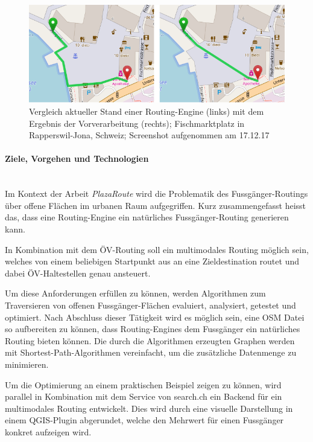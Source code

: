 \begin{figure}[ht]
    \centering
    \includegraphics[width=1\linewidth]{technicalreport/img/compare_fischmarktplatz.png}
    \caption[Vergleich Ausgangslage und Ergebnis]{Vergleich aktueller Stand einer Routing-Engine (links) mit dem Ergebnis der Vorverarbeitung (rechts); Fischmarktplatz in Rapperswil-Jona, Schweiz; Screenshot aufgenommen am 17.12.17}
    \label{fig:compare_fischmarktplatz}
\end{figure}


\paragraph{Ziele, Vorgehen und Technologien}~\\
Im Kontext der Arbeit \emph{PlazaRoute} wird die Problematik des Fussgänger-Routings über offene Flächen im urbanen Raum aufgegriffen. Kurz zusammengefasst heisst das, dass eine Routing-Engine ein natürliches Fussgänger-Routing generieren kann.

In Kombination mit dem ÖV-Routing soll ein multimodales Routing möglich sein, welches von einem beliebigen Startpunkt aus an eine Zieldestination routet und dabei ÖV-Haltestellen genau ansteuert.

Um diese Anforderungen erfüllen zu können, werden Algorithmen zum Traversieren von offenen Fussgänger-Flächen evaluiert, analysiert, getestet und optimiert. Nach Abschluss dieser Tätigkeit wird es möglich sein, eine \ac{OSM} Datei so aufbereiten zu können, dass Routing-Engines dem Fussgänger ein natürliches Routing bieten können. Die durch die Algorithmen erzeugten Graphen werden mit Shortest-Path-Algorithmen vereinfacht, um die zusätzliche Datenmenge zu minimieren.

Um die Optimierung an einem praktischen Beispiel zeigen zu können, wird parallel in Kombination mit dem Service von search.ch ein Backend für ein multimodales Routing entwickelt. Dies wird durch eine visuelle Darstellung in einem QGIS-Plugin abgerundet, welche den Mehrwert für einen Fussgänger konkret aufzeigen wird.

